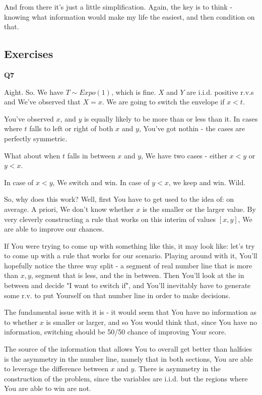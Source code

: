 \documentclass{article}
\begin{document}
		And from there it's just a little simplification. Again, the key is to think - knowing what information would make my life the easiest, and then condition on that.
			
	\subsection{Exercises}
	
		\textbf{Q7}
		
			Aight. So. We have $T\sim Expo(1)$, which is fine. $X$ and $Y$ are i.i.d. positive r.v.s and We've observed that $X=x$. We are going to switch the envelope if $x<t$.
			
			You've observed $x$, and $y$ is equally likely to be more than or less than it. In cases where $t$ falls to left or right of both $x$ and $y$, You've got nothin - the cases are perfectly symmetric.
			
			What about when $t$ falls in between $x$ and $y$, We have two cases - either $x<y$ or $y<x$.
			
			In case of $x<y$, We switch and win. In case of $y<x$, we keep and win. Wild.
			
			So, why does this work? Well, first You have to get used to the idea of: on average. A priori, We don't know whether $x$ is the smaller or the larger value. By very cleverly constructing a rule that works on this interim of values $[x, y]$, We are able to improve our chances.
			
			If You were trying to come up with something like this, it may look like: let's try to come up with a rule that works for our scenario. Playing around with it, You'll hopefully notice the three way split - a segment of real number line that is more than $x, y$, segment that is less, and the in between. Then You'll look at the in between and decide "I want to switch if", and You'll inevitably have to generate some r.v. to put Yourself on that number line in order to make decisions.
			
			The fundamental issue with it is - it would seem that You have no information as to whether $x$ is smaller or larger, and so You would think that, since You have no information, switching should be 50/50 chance of improving Your score. 
			
			The source of the information that allows You to overall get better than halfsies is the asymmetry in the number line, namely that in both sections, You are able to leverage the difference between $x$ and $y$. There is asymmetry in the construction of the problem, since the variables are i.i.d. but the regions where You are able to win are not.
			
\end{document}

